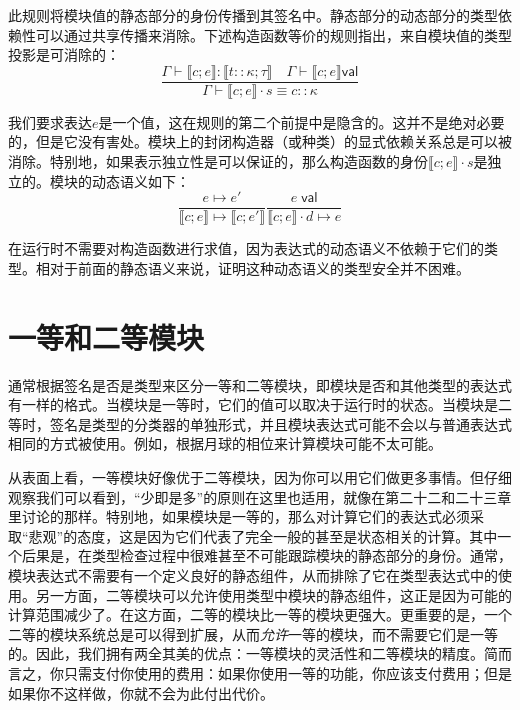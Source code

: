 此规则将模块值的静态部分的身份传播到其签名中。静态部分的动态部分的类型依赖性可以通过共享传播来消除。下述构造函数等价的规则指出，来自模块值的类型投影是可消除的：
\begin{equation}\label{44_6}
\frac{\Gamma\vdash\llbracket c;e\rrbracket :\llbracket t::\kappa;\tau\rrbracket \quad\Gamma\vdash\llbracket c;e\rrbracket \mathsf{val}}{\Gamma\vdash\llbracket c;e\rrbracket \cdot s \equiv c::\kappa}
\end{equation}

我们要求表达$e$是一个值，这在规则的第二个前提中是隐含的。这并不是绝对必要的，但是它没有害处。模块上的封闭构造器（或种类）的显式依赖关系总是可以被消除。特别地，如果表示独立性是可以保证的，那么构造函数的身份$\llbracket c;e\rrbracket \cdot s$是独立的。模块的动态语义如下：
\begin{subequations}

\begin{equation}\label{44_7_a}
\frac{e \mapsto e'}{\llbracket c;e\rrbracket \mapsto\llbracket c;e'\rrbracket }
\end{equation}

\begin{equation}\label{44_7_b}
\frac{e\;\mathsf{val}}{\llbracket c;e\rrbracket \cdot d\mapsto e}
\end{equation}
\end{subequations}

在运行时不需要对构造函数进行求值，因为表达式的动态语义不依赖于它们的类型。相对于前面的静态语义来说，证明这种动态语义的类型安全并不困难。

\section{一等和二等模块}

通常根据签名是否是类型来区分一等和二等模块，即模块是否和其他类型的表达式有一样的格式。当模块是一等时，它们的值可以取决于运行时的状态。当模块是二等时，签名是类型的分类器的单独形式，并且模块表达式可能不会以与普通表达式相同的方式被使用。例如，根据月球的相位来计算模块可能不太可能。

从表面上看，一等模块好像优于二等模块，因为你可以用它们做更多事情。但仔细观察我们可以看到，“少即是多”的原则在这里也适用，就像在第二十二和二十三章里讨论的那样。特别地，如果模块是一等的，那么对计算它们的表达式必须采取“悲观”的态度，这是因为它们代表了完全一般的甚至是状态相关的计算。其中一个后果是，在类型检查过程中很难甚至不可能跟踪模块的静态部分的身份。通常，模块表达式不需要有一个定义良好的静态组件，从而排除了它在类型表达式中的使用。另一方面，二等模块可以允许使用类型中模块的静态组件，这正是因为可能的计算范围减少了。在这方面，二等的模块比一等的模块更强大。更重要的是，一个二等的模块系统总是可以得到扩展，从而\textit{允许}一等的模块，而不需要它们是一等的。因此，我们拥有两全其美的优点：一等模块的灵活性和二等模块的精度。简而言之，你只需支付你使用的费用：如果你使用一等的功能，你应该支付费用；但是如果你不这样做，你就不会为此付出代价。


